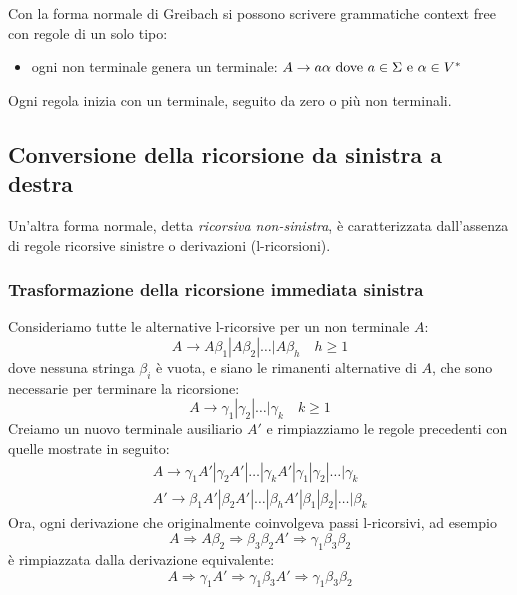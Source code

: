 \documentclass[11pt]{article}
\begin{document}
Con la forma normale di Greibach si possono scrivere grammatiche context free con regole di un solo tipo:
\begin{itemize}
    \item ogni non terminale genera un terminale: $A\rightarrow a\alpha \textnormal{ dove } a\in \Sigma \textnormal{ e } \alpha\in V^*$
\end{itemize}
Ogni regola inizia con un terminale, seguito da zero o più non terminali.
\subsection{Conversione della ricorsione da sinistra a destra}
Un'altra forma normale, detta \textit{ricorsiva non-sinistra}, è caratterizzata dall'assenza di regole ricorsive sinistre
o derivazioni (l-ricorsioni).
\subsubsection*{Trasformazione della ricorsione immediata sinistra}
Consideriamo tutte le alternative l-ricorsive per un non terminale $A$:
\begin{equation*}
    A\rightarrow A\beta_1|A\beta_2|\dots|A\beta_h \quad h\geq 1
\end{equation*}
dove nessuna stringa $\beta_i$ è vuota, e siano le rimanenti alternative di $A$, che sono necessarie per terminare la ricorsione:
\begin{equation*}
    A\rightarrow \gamma_1|\gamma_2|\dots|\gamma_k \quad k\geq 1
\end{equation*}
Creiamo un nuovo terminale ausiliario $A'$ e rimpiazziamo le regole precedenti con quelle mostrate in seguito:
\begin{align*}
    A\rightarrow \gamma_1 A'|\gamma_2 A'|\dots|\gamma_k A'|\gamma_1|\gamma_2|\dots|\gamma_k\\
    A'\rightarrow \beta_1 A'|\beta_2 A'|\dots|\beta_h A'|\beta_1|\beta_2|\dots|\beta_k
\end{align*}
Ora, ogni derivazione che originalmente coinvolgeva passi l-ricorsivi, ad esempio
\begin{equation*}
    A\Rightarrow A\beta_2 \Rightarrow\beta_3\beta_2 A'\Rightarrow \gamma_1\beta_3\beta_2
\end{equation*}
è rimpiazzata dalla derivazione equivalente:
\begin{equation*}
    A\Rightarrow\gamma_1 A'\Rightarrow\gamma_1\beta_3 A'\Rightarrow\gamma_1\beta_3\beta_2
\end{equation*}
\end{document}
